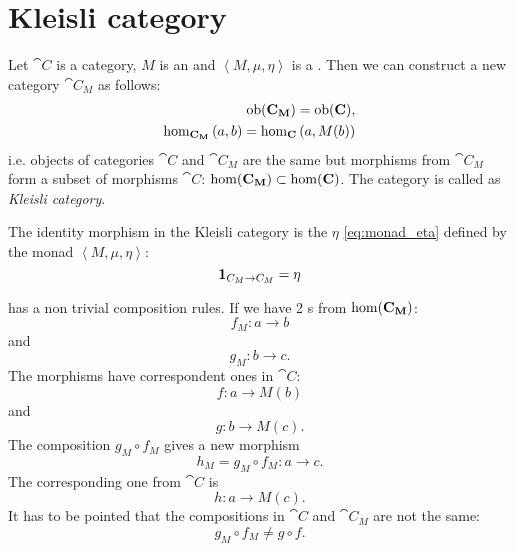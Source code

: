 \chapter{Kleisli category}

\begin{definition}
\label{def:kleisli_category}
Let $\cat{C}$ is a category, $M$ is an  and
$\left<M, \mu, \eta\right>$ is a . Then we can
construct a new category $\cat{C_M}$ as follows:
\begin{eqnarray}
\mathrm{ob}(\mathbf{C_M}) = \mathrm{ob}(\mathbf{C}),
\nonumber \\
\hom_{\mathbf{C_M}}\left(a, b\right) = 
\hom_{\mathbf{C}}\left(a, M(b)\right)
\nonumber
\end{eqnarray}
i.e. objects of categories $\cat{C}$ and $\cat{C_M}$ are the same but
morphisms from $\cat{C_M}$ form a subset of morphisms $\cat{C}$:
$\mathrm{hom}(\mathbf{C_M}) \subset \mathrm{hom}(\mathbf{C})$. The category is called as
\textit{Kleisli category}. 

The identity morphism in the Kleisli category is the
 $\eta$ \eqref{eq:monad_eta} defined by the monad
$\left<M, \mu, \eta\right>$: 
\[
\mathbf{1}_{ C_M \to C_M } = \eta
\]
\end{definition}

\begin{remark}
 has a non trivial composition rules.
If we have 2 s from $\mathrm{hom}(\mathbf{C_M})$:
\[
f_M: a \to b
\]
and
\[
g_M: b \to c.
\]
The morphisms have correspondent ones in $\cat{C}$:
\[
f: a \to M(b)
\]
and
\[
g: b \to M(c).
\]
The composition $g_M \circ f_M$ gives a new morphism
\[
h_M = g_M \circ f_M: a \to c.
\]
The corresponding one from $\cat{C}$ is
\[
h: a \to M(c).
\]
It has to be pointed that the compositions in $\cat{C}$ and
$\cat{C_M}$ are not the same:
\[
g_M \circ f_M \ne g \circ f.
\]
\end{remark}

